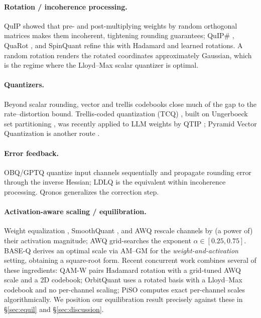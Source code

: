 \documentclass[11pt]{article}
\begin{document}
\paragraph{Rotation / incoherence processing.} QuIP \citep{chee2023quip} showed
that pre- and post-multiplying weights by random orthogonal matrices makes them
incoherent, tightening rounding guarantees; QuIP\# \citep{tseng2024quipsharp},
QuaRot \citep{ashkboos2024quarot}, and SpinQuant \citep{liu2024spinquant} refine
this with Hadamard and learned rotations. A random rotation renders the rotated
coordinates approximately Gaussian, which is the regime where the Lloyd--Max
scalar quantizer \citep{lloyd1982,max1960} is optimal.

\paragraph{Quantizers.} Beyond scalar rounding, vector and trellis codebooks
close much of the gap to the rate--distortion bound. Trellis-coded quantization
(TCQ) \citep{marcellin1990tcq}, built on Ungerboeck set partitioning
\citep{ungerboeck1982}, was recently applied to LLM weights by QTIP
\citep{tseng2024qtip}; Pyramid Vector Quantization is another route
\citep{vanderouderaa2024pvq}.

\paragraph{Error feedback.} OBQ/GPTQ \citep{frantar2022obc,frantar2023gptq}
quantize input channels sequentially and propagate rounding error through the
inverse Hessian; LDLQ \citep{chee2023quip} is the equivalent within incoherence
processing. Qronos \citep{zhang2025qronos} generalizes the correction step.

\paragraph{Activation-aware scaling / equilibration.} Weight equalization
\citep{nagel2019dfq}, SmoothQuant \citep{xiao2023smoothquant}, and AWQ
\citep{lin2024awq} rescale channels by (a power of) their activation magnitude;
AWQ grid-searches the exponent $\alpha\in[0.25,0.75]$. BASE-Q \citep{he2025baseq}
derives an optimal scale via AM--GM for the \emph{weight-and-activation} setting,
obtaining a square-root form. Recent concurrent work combines several of these
ingredients: QAM-W \citep{sharma2026qamw} pairs Hadamard rotation with a
grid-tuned AWQ scale and a 2D codebook; OrbitQuant \citep{lee2026orbitquant}
uses a rotated basis with a Lloyd--Max codebook and no per-channel scaling; PiSO
\citep{amboage2026piso} computes exact per-channel scales algorithmically. We
position our equilibration result precisely against these in \S\ref{sec:equil}
and \S\ref{sec:discussion}.
\end{document}
